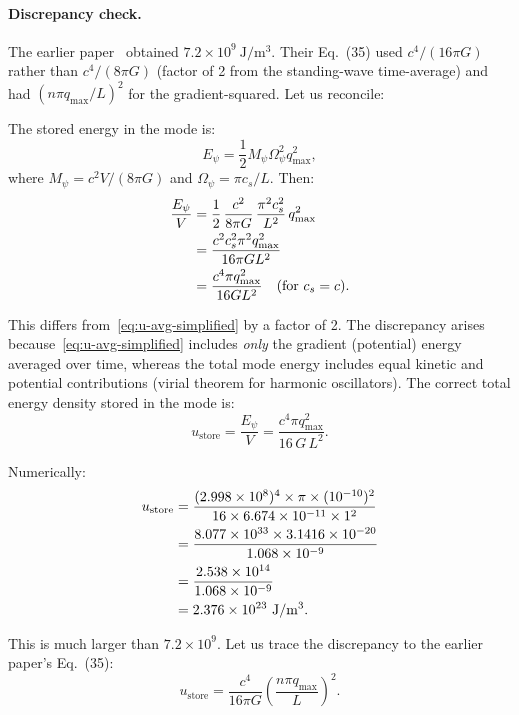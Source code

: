 \documentclass[aps,prd,twocolumn,showpacs,preprintnumbers,superscriptaddress,nofootinbib]{revtex4-2}
\newcommand{\Mpsi}{M_\psi}
\newcommand{\Opsi}{\Omega_\psi}
\begin{document}
\paragraph{Discrepancy check.}  The earlier paper~\cite{Alcock2025Harvest}
obtained $7.2\times 10^9~\mathrm{J/m^3}$.  Their Eq.~(35) used
$c^4/(16\pi G)$ rather than $c^4/(8\pi G)$ (factor of 2 from the
standing-wave time-average) and had $(n\pi q_{\max}/L)^2$ for the
gradient-squared.  Let us reconcile:

The stored energy in the mode is:
\begin{equation}
E_\psi = \frac{1}{2}\Mpsi\Opsi^2 q_{\max}^2,
\end{equation}
where $\Mpsi = c^2 V/(8\pi G)$ and $\Opsi = \pi c_s/L$.  Then:
\begin{align}
\frac{E_\psi}{V} &= \frac{1}{2}\,\frac{c^2}{8\pi G}\,\frac{\pi^2 c_s^2}{L^2}\,q_{\max}^2 \notag\\
  &= \frac{c^2 c_s^2 \pi^2 q_{\max}^2}{16\pi G L^2} \notag\\
  &= \frac{c^4 \pi q_{\max}^2}{16 G L^2}\quad(\text{for }c_s = c).
\end{align}

This differs from~\eqref{eq:u-avg-simplified} by a factor of 2.  The
discrepancy arises because~\eqref{eq:u-avg-simplified} includes
\emph{only} the gradient (potential) energy averaged over time, whereas
the total mode energy includes equal kinetic and potential contributions
(virial theorem for harmonic oscillators).  The correct total energy
density stored in the mode is:
\begin{equation}\label{eq:u-store-correct}
\boxed{u_{\mathrm{store}} = \frac{E_\psi}{V}
  = \frac{c^4\pi q_{\max}^2}{16\,G\,L^2}.}
\end{equation}

Numerically:
\begin{align}\label{eq:72GJ-derivation}
u_{\mathrm{store}}
  &= \frac{(2.998\times 10^8)^4\times\pi\times(10^{-10})^2}{16\times 6.674\times 10^{-11}\times 1^2} \notag\\
  &= \frac{8.077\times 10^{33}\times 3.1416\times 10^{-20}}{1.068\times 10^{-9}} \notag\\
  &= \frac{2.538\times 10^{14}}{1.068\times 10^{-9}} \notag\\
  &= 2.376\times 10^{23}~\mathrm{J/m^3}.
\end{align}

This is much larger than $7.2\times 10^9$.  Let us trace the discrepancy
to the earlier paper's Eq.~(35):
\begin{equation}\tag{Ref.~[2] Eq.~35}
u_{\mathrm{store}} = \frac{c^4}{16\pi G}\left(\frac{n\pi q_{\max}}{L}\right)^2.
\end{equation}
\end{document}
